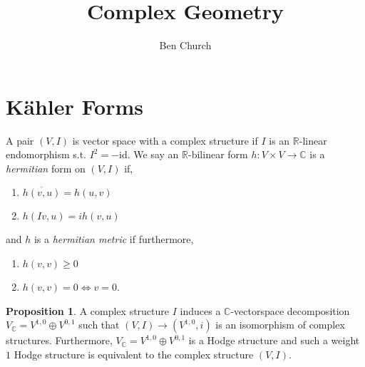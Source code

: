 \documentclass[12pt]{extarticle}
\newcommand{\R}{\mathbb{R}}
\newcommand{\C}{\mathbb{C}}
\newcommand{\id}{\mathrm{id}}
\theoremstyle{definition}
\newtheorem{proposition}[theorem]{Proposition}
\newenvironment{definition}[1][Definition:]{\begin{trivlist}
\item[\hskip \labelsep {\bfseries #1}]}{\end{trivlist}}
\begin{document}
\title{Complex Geometry}
\author{Ben Church}
\maketitle
\tableofcontents
\newpage

\section{K\"{a}hler Forms}

\begin{definition}
A pair $(V, I)$ is vector space with a complex structure if $I$ is an $\mathbb{R}$-linear endomorphism s.t. $I^2 = - \id$. We say an $\R$-bilinear form $h : V \times V \to \C$ is a \textit{hermitian} form on $(V, I)$ if,
\begin{enumerate}
\item $\overline{h(v,u)} = h(u,v)$
\item $h(I v, u) = i h(v, u)$
\end{enumerate} 
and $h$ is a \textit{hermitian metric} if furthermore,
\begin{enumerate}
\item $h(v, v) \ge 0$ 
\item $h(v, v) = 0 \iff v = 0$.
\end{enumerate}
\end{definition}

\begin{proposition}
A complex structure $I$ induces a $\C$-vectorspace decomposition $V_\C = V^{1,0} \oplus V^{0,1}$ such that $(V, I) \to (V^{1,0}, i)$ is an isomorphism of complex structures. Furthermore, $V_\C = V^{1,0} \oplus V^{0,1}$ is a Hodge structure and such a weight $1$ Hodge structure is equivalent to the complex structure $(V, I)$. 
\end{proposition}
\end{document}
